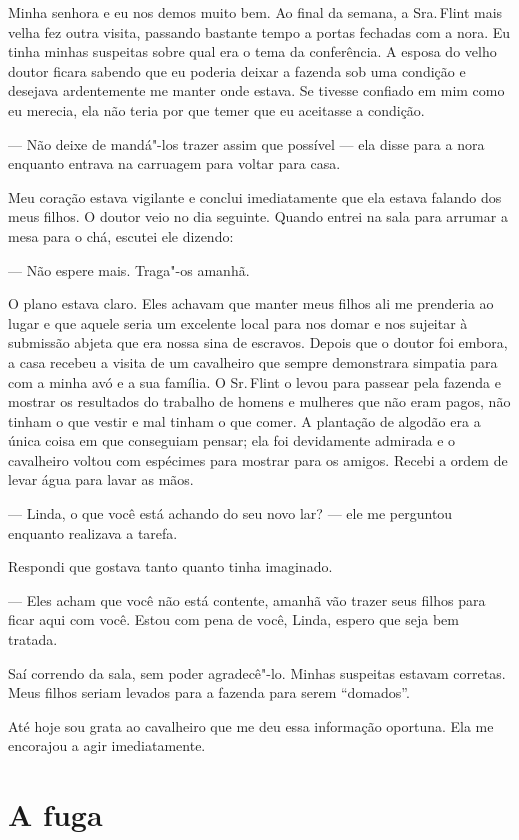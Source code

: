 Minha senhora e eu nos demos muito bem.
Ao final da semana, a Sra.\,Flint mais velha fez outra visita, passando
bastante tempo a portas fechadas com a nora. Eu tinha minhas suspeitas
sobre qual era o tema da conferência. A esposa do velho doutor ficara
sabendo que eu poderia deixar a fazenda sob uma condição e desejava
ardentemente me manter onde estava. Se tivesse confiado em mim como eu
merecia, ela não teria por que temer que eu aceitasse a condição.

--- Não deixe de mandá"-los trazer assim que possível --- ela disse para
a nora enquanto entrava na carruagem para voltar para casa.

Meu coração estava vigilante e conclui imediatamente que ela estava
falando dos meus filhos. O doutor veio no dia seguinte. Quando entrei na
sala para arrumar a mesa para o chá, escutei ele dizendo:

--- Não espere mais. Traga"-os amanhã.

O plano estava claro. Eles achavam que manter meus filhos ali me
prenderia ao lugar e que aquele seria um excelente local para nos domar
e nos sujeitar à submissão abjeta que era nossa sina de escravos. Depois
que o doutor foi embora, a casa recebeu a visita de um cavalheiro que
sempre demonstrara simpatia para com a minha avó e a sua família. O Sr.\,Flint o levou para passear pela fazenda e mostrar os resultados do
trabalho de homens e mulheres que não eram pagos, não tinham o que
vestir e mal tinham o que comer. A plantação de algodão era a única
coisa em que conseguiam pensar; ela foi devidamente admirada e o
cavalheiro voltou com espécimes para mostrar para os amigos. Recebi a
ordem de levar água para lavar as mãos.

--- Linda, o que você está achando do seu novo lar? --- ele me perguntou
enquanto realizava a tarefa.

Respondi que gostava tanto quanto tinha imaginado.

--- Eles acham que você não está contente, amanhã vão trazer seus filhos
para ficar aqui com você. Estou com pena de você, Linda, espero que seja
bem tratada.

Saí correndo da sala, sem poder agradecê"-lo. Minhas suspeitas estavam
corretas. Meus filhos seriam levados para a fazenda para serem
``domados''.

Até hoje sou grata ao cavalheiro que me
deu essa informação oportuna. Ela me encorajou a agir imediatamente.

\chapter*{A fuga}

